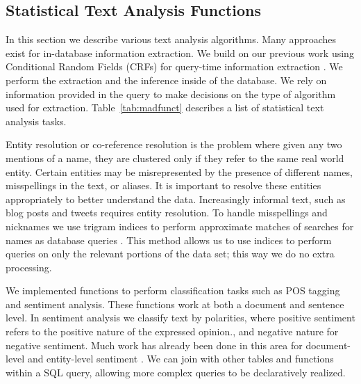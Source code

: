 \subsection{Statistical Text Analysis Functions}

In this section we describe various text analysis algorithms.
Many approaches exist for in-database information extraction. 
We build on our previous work using Conditional Random Fields (CRFs) for 
query-time information extraction \cite{wang2011hybrid}.
We perform the extraction and the inference inside of the database. 
We rely on information
provided in the query to make decisions on the type of algorithm used 
for extraction. 
Table~\ref{tab:madfunct} describes a list of statistical text 
analysis tasks.

Entity resolution or co-reference resolution is the problem where given any two
mentions of a name, they are clustered only if they refer to the same real 
world entity. 
Certain entities may be misrepresented by the presence of different names, 
misspellings in the text, or aliases. It is important to
resolve these entities appropriately to better understand the data. Increasingly
informal text, such as blog posts and tweets requires entity resolution. 
To handle misspellings and nicknames we use trigram indices to perform 
approximate matches of searches for names as database queries 
\cite{Jain:2009:BQO:1519103.1519108}. 
This method allows us to use indices to perform queries on only the relevant
portions of the data set; this way we do no extra processing.

We implemented functions to perform classification tasks such as POS tagging and 
sentiment analysis. These functions work at both a document and sentence level.
In sentiment analysis we classify text by polarities, where positive
sentiment refers to the positive nature of the expressed opinion., and negative
nature for negative sentiment. Much work has already been done in this
area for document-level and entity-level sentiment \cite{o2010tweets,
zhang2011combining}. 
 We can join with other tables
and functions within a SQL query, allowing more complex queries to be 
declaratively realized. 


